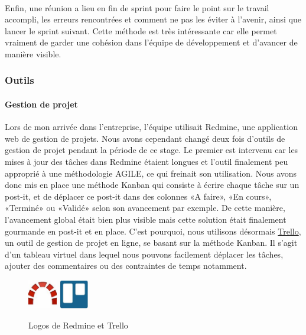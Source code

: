 \paragraph{}Enfin, une réunion a lieu en fin de sprint pour faire le point sur le travail accompli, les erreurs rencontrées et comment ne pas les éviter à l'avenir, ainsi que lancer le sprint suivant. Cette méthode est très intéressante car elle permet vraiment de garder une cohésion dans l’équipe de développement et d’avancer de manière visible. 

	\subsubsection{Outils}
		\paragraph{Gestion de projet\\}
Lors de mon arrivée dans l'entreprise, l’équipe utilisait Redmine, une application web de gestion de projets. Nous avons cependant changé deux fois d'outils de gestion de projet pendant la période de ce stage. Le premier est intervenu car les mises à jour des tâches dans Redmine étaient longues et l'outil finalement peu approprié à une méthodologie AGILE, ce qui freinait son utilisation. Nous avons donc mis en place une méthode Kanban qui consiste à écrire chaque tâche sur un post-it, et de déplacer ce post-it dans des colonnes «A faire», «En cours», «Terminé» ou «Validé» selon son avancement par exemple. De cette manière, l’avancement global était bien plus visible mais cette solution était finalement gourmande en post-it et en place. C'est pourquoi, nous utilisons désormais \href{www.trello.com}{Trello}, un outil de gestion de projet en ligne, se basant sur la méthode Kanban. Il s’agit d’un tableau virtuel dans lequel nous pouvons facilement déplacer les tâches, ajouter des commentaires ou des contraintes de temps notamment.

	\begin{figure}[!h]
		\centering
		\includegraphics[height=48px]{images/redmine.jpg}
		\includegraphics[height=48px]{images/trello.jpg}
		\caption{Logos de Redmine et Trello}
		\label{Logos de Redmine et Trello}
	\end{figure}

